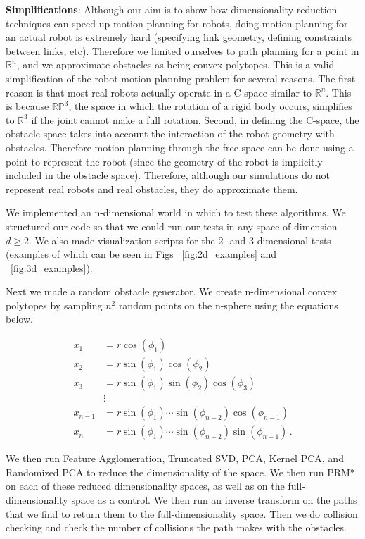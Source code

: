 \documentclass[12pt]{article}
\begin{document}
\textbf{Simplifications}: Although our aim is to show how dimensionality reduction techniques can speed up motion planning for robots, doing motion planning for an actual robot is extremely hard (specifying link geometry, defining constraints between links, etc). Therefore we limited ourselves to path planning for a point in $\mathbb{R}^n$, and we approximate obstacles as being convex polytopes. This is a valid simplification of the robot motion planning problem for several reasons. The first reason is that most real robots actually operate in a C-space similar to $\mathbb{R}^n$. This is because $\mathbb{RP}^3$, the space in which the rotation of a rigid body occurs, simplifies to $\mathbb{R}^3$ if the joint cannot make a full rotation. Second, in defining the C-space, the obstacle space takes into account the interaction of the robot geometry with obstacles. Therefore motion planning through the free space can be done using a point to represent the robot (since the geometry of the robot is implicitly included in the obstacle space). Therefore, although our simulations do not represent real robots and real obstacles, they do approximate them.

We implemented an n-dimensional world in which to test these algorithms. We structured our code so that we could run our tests in any space of dimension $d \geq 2$. We also made visualization scripts for the 2- and 3-dimensional tests (examples of which can be seen in Figs ~\ref{fig:2d_examples} and ~\ref{fig:3d_examples}).

Next we made a random obstacle generator. We create n-dimensional convex polytopes by sampling $n^{2}$ random points on the n-sphere using the equations below. 

\begin{align*}
x_1 &= r \cos(\phi_1) \\
x_2 &= r \sin(\phi_1) \cos(\phi_2) \\
x_3 &= r \sin(\phi_1) \sin(\phi_2) \cos(\phi_3) \\
    &\vdots\\
x_{n-1} &= r \sin(\phi_1) \cdots \sin(\phi_{n-2}) \cos(\phi_{n-1}) \\
x_n &= r \sin(\phi_1) \cdots \sin(\phi_{n-2}) \sin(\phi_{n-1}) \,.
\end{align*}

We then run Feature Agglomeration, Truncated SVD, PCA, Kernel PCA, and Randomized PCA to reduce the dimensionality of the space. We then run PRM* on each of these reduced dimensionality spaces, as well as on the full-dimensionality space as a control. We then run an inverse transform on the paths that we find to return them to the full-dimensionality space. Then we do collision checking and check the number of collisions the path makes with the obstacles.
\end{document}
